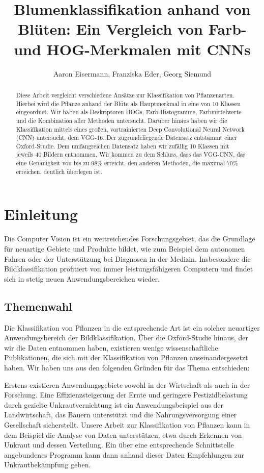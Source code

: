\documentclass[11pt,a4paper]{article}
\begin{document}
\title{Blumenklassifikation anhand von Blüten: Ein Vergleich von Farb- und HOG-Merkmalen mit CNNs}
\author{Aaron Eisermann, Franziska Eder, Georg Siemund}
\maketitle

\begin{abstract}
Diese Arbeit vergleicht verschiedene Ansätze zur Klassifikation von Pflanzenarten. Hierbei wird die Pflanze anhand der Blüte als Hauptmerkmal in eine von 10 Klassen eingeordnet. Wir haben als Deskriptoren HOGs, Farb-Histogramme, Farbmittelwerte und die Kombination aller Methoden untersucht. Darüber hinaus haben wir die Klassifikation mittels eines großen, vortrainierten Deep Convolutional Neural Network (CNN) untersucht, dem VGG-16. Der zugrundeliegende Datensatz entstammt einer Oxford-Studie. Dem umfangreichen Datensatz haben wir zufällig 10 Klassen mit jeweils 40 Bildern entnommen. Wir kommen zu dem Schluss, dass das VGG-CNN, das eine Genauigkeit von bis zu 98\% erreicht, den anderen Methoden, die ma\-ximal 70\% erreichen,  deutlich überlegen ist.
\end{abstract}

\section{Einleitung}
Die Computer Vision ist ein weitreichendes Forschungsgebiet, das die Grundlage für neuartige Gebiete und Produkte bildet, wie zum Beispiel dem autonomen Fahren oder der Unterstützung bei Diagnosen in der Medizin. Insbesondere die Bildklassifikation profitiert von immer leistungsfähigeren Computern und findet sich in stetig neuen Anwendungsbereichen wieder.

\subsection{Themenwahl}
Die Klassifikation von Pflanzen in die entsprechende Art ist ein solcher neuartiger Anwendungsbereich der Bildklassifikation. Über die Oxford-Studie hinaus, der wir die Daten entnommen haben, existieren wenige wissenschaftliche Publikationen, die sich mit der Klassifikation von Pflanzen auseinandergesetzt haben. Wir haben uns aus den folgenden Gründen für das Thema entschieden:

Erstens existieren Anwendungsgebiete sowohl in der Wirtschaft als auch in der Forschung. Eine Effizienzsteigerung der Ernte und geringere Pestizidbelastung durch gezielte Unkrautvernichtung ist ein Anwendungsbeispiel aus der Landwirtschaft, das Bauern unterstützt und die Nahrungsversorgung einer Gesellschaft sicherstellt. Unsere Arbeit zur Klassifikation von Pflanzen kann in dem Beispiel die Analyse von Daten unterstützen, etwa durch Erkennen von Unkraut und dessen Verteilung. Ein über eine entsprechende Schnitt\-stelle angebundenes Programm kann dann anhand dieser Daten Empfehlungen zur Unkrautbekämpfung geben.
\end{document}
